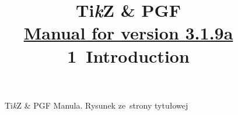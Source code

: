 \documentclass[a4paper,11pt]{article}
\title{Ti\textit{k}Z \& PGF \\
  \href{http://piotrkosoft.net/pub/mirrors/CTAN/graphics/pgf/base/doc/pgfmanual.pdf}{Manual for version 3.1.9a} \\
  1~Introduction}
\author{}
\begin{document}





\maketitle %






\begin{figure}[ht]

  \centering

  \begin{tikzpicture}



  \end{tikzpicture}

  \caption{Ti\textit{k}Z \& PGF Manula. Rysunek ze~strony tytułowej}

\end{figure}





\newpage
























\end{document}
